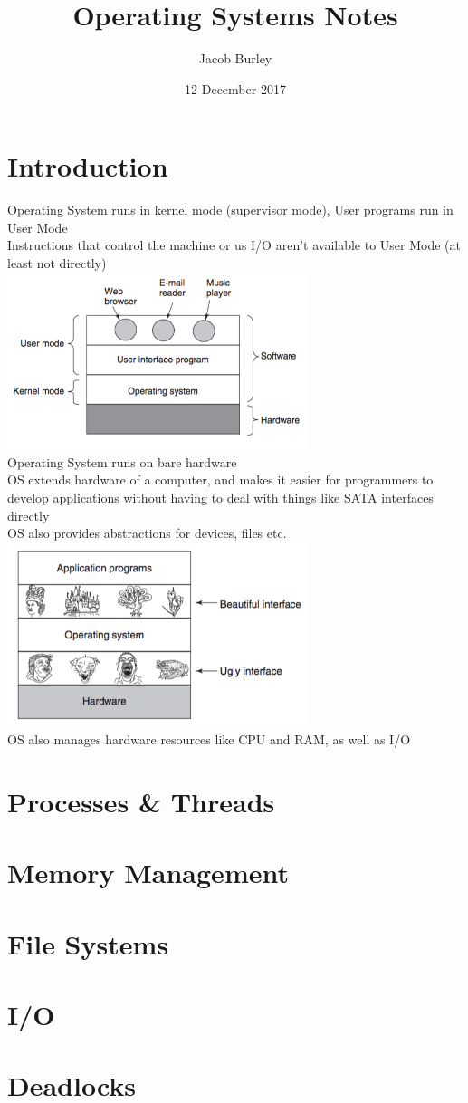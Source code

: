 \documentclass{article}
\title{Operating Systems Notes}
\author{Jacob Burley} %
\date{12 December 2017}
\begin{document}
\graphicspath{ {/} }

\maketitle
\section{Introduction}
Operating System runs in kernel mode (supervisor mode), User programs run in User Mode
\\Instructions that control the machine or us I/O aren't available to User Mode (at least not directly)
\\\includegraphics[width= 250pt]{ch1/1-1.png}
\\Operating System runs on bare hardware
\\OS extends hardware of a computer, and makes it easier for programmers to develop applications without having to deal with things like SATA interfaces directly
\\OS also provides abstractions for devices, files etc.
\\\includegraphics[width = 250pt]{ch1/1-2.png}
\\OS also manages hardware resources like CPU and RAM, as well as I/O
\section{Processes & Threads}

\section{Memory Management}

\section{File Systems}

\section{I/O}

\section{Deadlocks}
\end{document}

